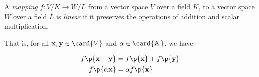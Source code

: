 \begin{definition}

A \emph{mapping} $f: V/K \rightarrow W/L$ from a vector space $V$ over a field
$K$, to a vector space $W$ over a field $L$ is \emph{linear} if it preserves
the operations of addition and scalar multiplication.

That is, for all $\mathbf{x}, \mathbf{y} \in \card{V}$ and $\alpha \in
\card{K}$, we have:

\begin{align}
f\p{\mathbf{x}+\mathbf{y}} &= f\p{\mathbf{x}} + f\p{\mathbf{y}}\\
f\p{\alpha \mathbf{x}} &= \alpha f\p{\mathbf{x}}
\end{align}

\end{definition}
